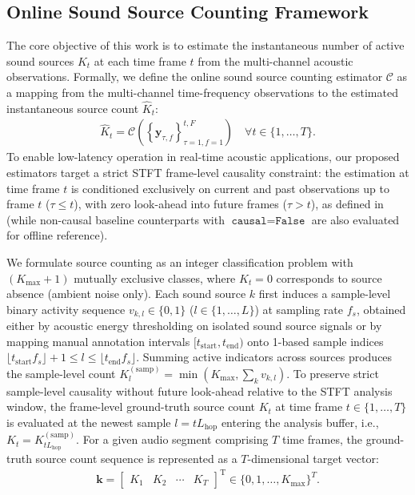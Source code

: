 \documentclass[lettersize,journal]{IEEEtran}
\begin{document}
\subsection{Online Sound Source Counting Framework}
\label{sec:problem_formulation}
The core objective of this work is to estimate the instantaneous number of active sound sources $K_t$ at each time frame $t$ from the multi-channel acoustic observations. Formally, we define the online sound source counting estimator $\mathcal{C}$ as a mapping from the multi-channel time-frequency observations to the estimated instantaneous source count $\widehat{K}_t$:
\begin{align}
  \widehat{K}_t = \mathcal{C}\left( \left\{ \mathbf{y}_{\tau, f} \right\}_{\tau=1, f=1}^{t, F} \right) \quad \forall t \in \{1, \ldots, T\}.
  \label{eq:strict_causality_definition}
\end{align}
To enable low-latency operation in real-time acoustic applications, our proposed estimators target a strict \gls{STFT} frame-level causality constraint: the estimation at time frame $t$ is conditioned exclusively on current and past observations up to frame $t$ ($\tau \leq t$), with zero look-ahead into future frames ($\tau > t$), as defined in~ (while non-causal baseline counterparts with $\texttt{causal} = \texttt{False}$ are also evaluated for offline reference).

We formulate source counting as an integer classification problem with $(K_{\mathrm{max}} + 1)$ mutually exclusive classes, where $K_t = 0$ corresponds to source absence (ambient noise only). Each sound source $k$ first induces a sample-level binary activity sequence $v_{k,l} \in \{0, 1\}$ ($l \in \{1, \dots, L\}$) at sampling rate $f_s$, obtained either by acoustic energy thresholding on isolated sound source signals or by mapping manual annotation intervals $[t_{\mathrm{start}}, t_{\mathrm{end}})$ onto 1-based sample indices $\lfloor t_{\mathrm{start}} f_s \rfloor + 1 \le l \le \lfloor t_{\mathrm{end}} f_s \rfloor$. Summing active indicators across sources produces the sample-level count $K_l^{(\mathrm{samp})} = \min(K_{\mathrm{max}}, \sum_k v_{k,l})$. To preserve strict sample-level causality without future look-ahead relative to the \gls{STFT} analysis window, the frame-level ground-truth source count $K_t$ at time frame $t \in \{1, \dots, T\}$ is evaluated at the newest sample $l = t L_{\mathrm{hop}}$ entering the analysis buffer, i.e., $K_t = K_{t L_{\mathrm{hop}}}^{(\mathrm{samp})}$. For a given audio segment comprising $T$ time frames, the ground-truth source count sequence is represented as a $T$-dimensional target vector:
\begin{align}
  \mathbf{k} = \begin{bmatrix} K_1 & K_2 & \cdots & K_T \end{bmatrix}^{\mathrm{T}} \in \{0, 1, \ldots, K_{\mathrm{max}}\}^{T}.
  \label{eq:target_vector}
\end{align}
\end{document}
